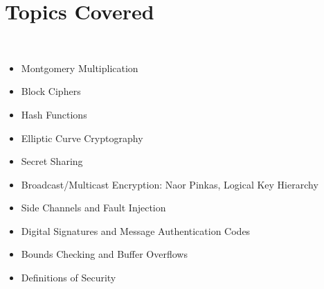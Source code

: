 \section{Topics Covered}
\\
\begin{itemize}
\item Montgomery Multiplication
\item Block Ciphers
\item Hash Functions
\item Elliptic Curve Cryptography
\item Secret Sharing
\item Broadcast/Multicast Encryption: Naor Pinkas, Logical Key Hierarchy
\item Side Channels and Fault Injection
\item Digital Signatures and Message Authentication Codes
\item Bounds Checking and Buffer Overflows
\item Definitions of Security
\end{itemize}